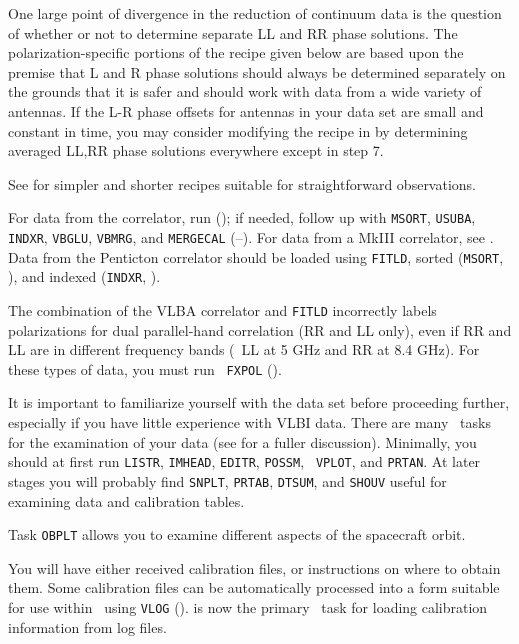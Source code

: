 One large point of divergence in the reduction of continuum
  data is the question of whether or not
to determine separate LL and RR phase solutions.  The
polarization-specific portions of the recipe given below are based
upon the premise that L and R phase solutions should always be
determined separately on the grounds that it is safer and should work
with data from a wide variety of antennas.  If the L-R phase offsets
for antennas in your data set are small and constant in time, you may
consider modifying the recipe in  by determining
averaged LL,RR phase solutions everywhere except in step 7.


See  for simpler and shorter recipes suitable for
straightforward observations.

\xbit
{}
For data from the  correlator, run {\tt {}}
(); if needed, follow up with {\tt MSORT}, {\tt USUBA},
{\tt INDXR}, {\tt VBGLU}, {\tt VBMRG}, and {\tt MERGECAL}
(--).  For data from a MkIII correlator,
see .  Data from the Penticton correlator should be loaded
using {\tt FITLD}, sorted ({\tt MSORT}, ), and indexed
({\tt INDXR}, ).

The combination of the VLBA correlator and {\tt FITLD} incorrectly
labels polarizations for dual parallel-hand correlation (RR and LL
only), even if RR and LL are in different frequency bands (\eg\ LL at
5 GHz and RR at 8.4 GHz).  For these types of data, you must run {\tt
FXPOL} ().

It is important to familiarize yourself with the data set before
proceeding further, especially if you have little experience with VLBI
data. There are many \AIPS\ tasks for the examination of your data
(see  for a fuller discussion).  Minimally, you should at
first run {\tt LISTR}, {\tt IMHEAD}, {\tt EDITR}, {\tt POSSM}, {\tt
VPLOT}, and {\tt PRTAN}\@.  At later stages you will probably find
{\tt SNPLT}, {\tt PRTAB}, {\tt DTSUM}, and {\tt SHOUV} useful for
examining data and calibration tables.

Task {\tt OBPLT} allows you to examine different aspects of the
spacecraft orbit.

You will have either received calibration files, or instructions on
where to obtain them.  Some calibration files can be automatically
processed into a form suitable for use within \AIPS\ using {\tt VLOG}
().  {\tt {}} is now the primary \AIPS\ task
for loading calibration information from log files.

